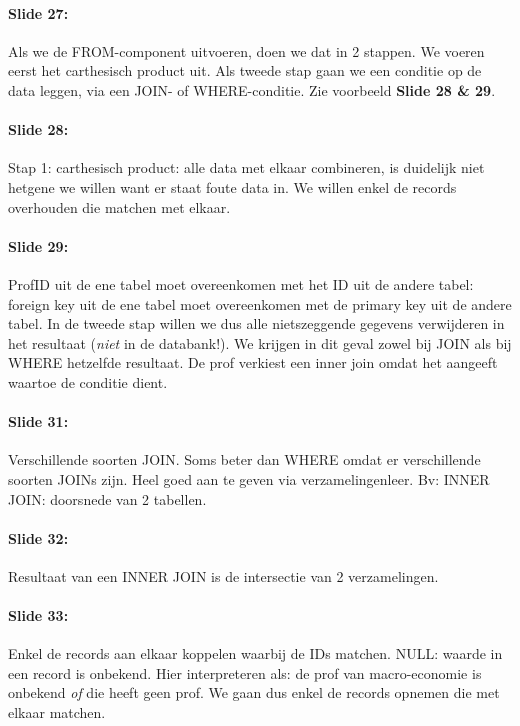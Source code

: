 \documentclass[10pt,a4paper]{report}
\begin{document}
\paragraph{Slide 27:}Als we de FROM-component uitvoeren, doen we dat in 2 stappen. We voeren eerst het carthesisch product uit. Als tweede stap gaan we een conditie op de data leggen, via een JOIN- of WHERE-conditie. Zie voorbeeld \textbf{Slide 28 \& 29}.

\paragraph{Slide 28:}Stap 1: carthesisch product: alle data met elkaar combineren, is duidelijk niet hetgene we willen want er staat foute data in. We willen enkel de records overhouden die matchen met elkaar.

\paragraph{Slide 29:}ProfID uit de ene tabel moet overeenkomen met het ID uit de andere tabel: foreign key uit de ene tabel moet overeenkomen met de primary key uit de andere tabel. In de tweede stap willen we dus alle nietszeggende gegevens verwijderen in het resultaat (\emph{niet} in de databank!). We krijgen in dit geval zowel bij JOIN als bij WHERE hetzelfde resultaat. De prof verkiest een inner join omdat het aangeeft waartoe de conditie dient.

\paragraph{Slide 31:}Verschillende soorten JOIN. Soms beter dan WHERE omdat er verschillende soorten JOINs zijn. Heel goed aan te geven via verzamelingenleer. Bv: INNER JOIN: doorsnede van 2 tabellen.

\paragraph{Slide 32:}Resultaat van een INNER JOIN is de intersectie van 2 verzamelingen.

\paragraph{Slide 33:}Enkel de records aan elkaar koppelen waarbij de IDs matchen. NULL: waarde in een record is onbekend. Hier interpreteren als: de prof van macro-economie is onbekend \emph{of} die heeft geen prof. We gaan dus enkel de records opnemen die met elkaar matchen.
\end{document}
